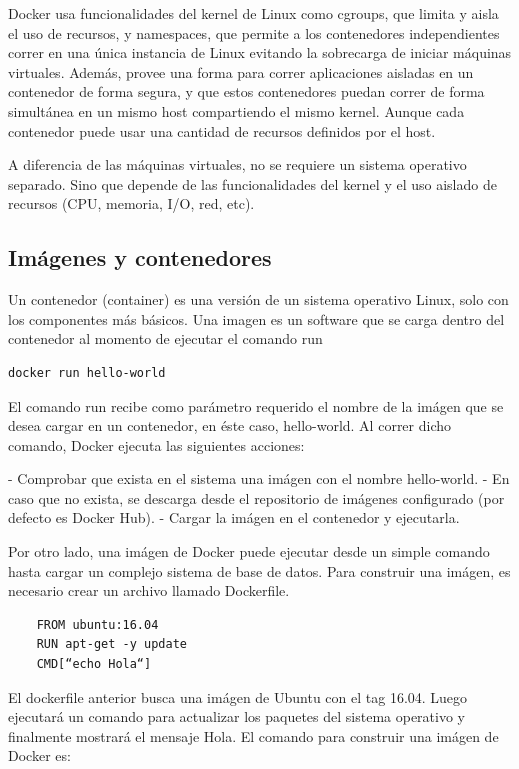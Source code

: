 Docker usa funcionalidades del kernel de Linux como cgroups, que limita y aisla el uso de recursos, y namespaces, que permite a los contenedores independientes correr en una única instancia de Linux evitando la sobrecarga de iniciar máquinas virtuales.
Además, provee una forma para correr aplicaciones aisladas en un contenedor de forma segura, y que estos contenedores puedan correr de forma simultánea en un mismo host compartiendo el mismo kernel. Aunque cada contenedor puede usar una cantidad de recursos definidos por el host.

A diferencia de las máquinas virtuales, no se requiere un sistema operativo separado. Sino que depende de las funcionalidades del kernel y el uso aislado de recursos (CPU, memoria, I/O, red, etc).

\subsection[Imágenes y contenedores]{Imágenes y contenedores}

Un contenedor (container) es una versión de un sistema operativo Linux, solo con los componentes más básicos. Una imagen es un software que se carga dentro del contenedor al momento de ejecutar el comando run

\begin{lstlisting}[language=bash]
    docker run hello-world
\end{lstlisting}


El comando run recibe como parámetro requerido el nombre de la imágen que se desea cargar en un contenedor, en éste caso, hello-world.
Al correr dicho comando, Docker ejecuta las siguientes acciones:

- Comprobar que exista en el sistema una imágen con el nombre hello-world.
- En caso que no exista, se descarga desde el repositorio de imágenes configurado (por defecto es Docker Hub).
- Cargar la imágen en el contenedor y ejecutarla.

Por otro lado, una imágen de Docker puede ejecutar desde un simple comando hasta cargar un complejo sistema de base de datos.
Para construir una imágen, es necesario crear un archivo llamado Dockerfile.

\begin{lstlisting}
    FROM ubuntu:16.04
    RUN apt-get -y update
    CMD[“echo Hola“]
\end{lstlisting}

El dockerfile anterior busca una imágen de Ubuntu con el tag 16.04. Luego ejecutará un comando para actualizar los paquetes del sistema operativo y finalmente mostrará el mensaje Hola.
El comando para construir una imágen de Docker es:


